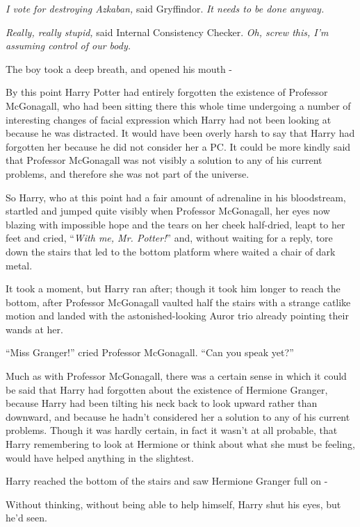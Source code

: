 \emph{I vote for destroying Azkaban,} said Gryffindor. \emph{It needs to be done anyway.}

\emph{Really, really stupid,} said Internal Consistency Checker. \emph{Oh, screw this, I'm assuming control of our body.}

The boy took a deep breath, and opened his mouth -

By this point Harry Potter had entirely forgotten the existence of Professor McGonagall, who had been sitting there this whole time undergoing a number of interesting changes of facial expression which Harry had not been looking at because he was distracted. It would have been overly harsh to say that Harry had forgotten her because he did not consider her a PC. It could be more kindly said that Professor McGonagall was not visibly a solution to any of his current problems, and therefore she was not part of the universe.

So Harry, who at this point had a fair amount of adrenaline in his bloodstream, startled and jumped quite visibly when Professor McGonagall, her eyes now blazing with impossible hope and the tears on her cheek half-dried, leapt to her feet and cried, ``\emph{With me, Mr. Potter!}'' and, without waiting for a reply, tore down the stairs that led to the bottom platform where waited a chair of dark metal.

It took a moment, but Harry ran after; though it took him longer to reach the bottom, after Professor McGonagall vaulted half the stairs with a strange catlike motion and landed with the astonished-looking Auror trio already pointing their wands at her.

``Miss Granger!'' cried Professor McGonagall. ``Can you speak yet?''

Much as with Professor McGonagall, there was a certain sense in which it could be said that Harry had forgotten about the existence of Hermione Granger, because Harry had been tilting his neck back to look upward rather than downward, and because he hadn't considered her a solution to any of his current problems. Though it was hardly certain, in fact it wasn't at all probable, that Harry remembering to look at Hermione or think about what she must be feeling, would have helped anything in the slightest.

Harry reached the bottom of the stairs and saw Hermione Granger full on -

Without thinking, without being able to help himself, Harry shut his eyes, but he'd seen.

